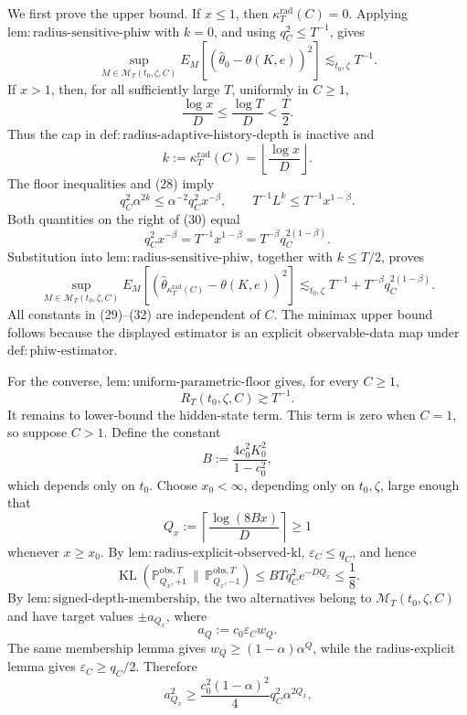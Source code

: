 We first prove the upper bound.  If \(x\le1\), then \(\kappa_T^{\mathrm{rad}}(C)=0\).  Applying \(\mathrm{lem{:}radius\text{-}sensitive\text{-}phiw}\) with \(k=0\), and using \(q_C^2\le T^{-1}\), gives
\[
 \sup_{M\in\mathcal M_T(t_0,\zeta,C)}
 E_M[(\widehat\theta_0-\theta(K,e))^2]
 \lesssim_{t_0,\zeta}T^{-1}. \tag{29}
\]
If \(x>1\), then, for all sufficiently large \(T\), uniformly in \(C\ge1\),
\[
 \frac{\log x}{D}\le\frac{\log T}{D}<\frac T2.
\]
Thus the cap in \(\mathrm{def{:}radius\text{-}adaptive\text{-}history\text{-}depth}\) is inactive and
\[
 k:=\kappa_T^{\mathrm{rad}}(C)=\left\lfloor\frac{\log x}{D}\right\rfloor.
\]
The floor inequalities and (28) imply
\[
 q_C^2\alpha^{2k}
 \le\alpha^{-2}q_C^2x^{-\beta},
 \qquad
 T^{-1}L^k
 \le T^{-1}x^{1-\beta}. \tag{30}
\]
Both quantities on the right of (30) equal
\[
 q_C^2x^{-\beta}
 =T^{-1}x^{1-\beta}
 =T^{-\beta}q_C^{2(1-\beta)}. \tag{31}
\]
Substitution into \(\mathrm{lem{:}radius\text{-}sensitive\text{-}phiw}\), together with \(k\le T/2\), proves
\[
 \sup_{M\in\mathcal M_T(t_0,\zeta,C)}
 E_M[(\widehat\theta_{\kappa_T^{\mathrm{rad}}(C)}-\theta(K,e))^2]
 \lesssim_{t_0,\zeta}
 T^{-1}+T^{-\beta}q_C^{2(1-\beta)}. \tag{32}
\]
All constants in (29)--(32) are independent of \(C\).  The minimax upper bound follows because the displayed estimator is an explicit observable-data map under \(\mathrm{def{:}phiw\text{-}estimator}\).

For the converse, \(\mathrm{lem{:}uniform\text{-}parametric\text{-}floor}\) gives, for every \(C\ge1\),
\[
 R_T(t_0,\zeta,C)\gtrsim T^{-1}. \tag{33}
\]
It remains to lower-bound the hidden-state term.  This term is zero when \(C=1\), so suppose \(C>1\).  Define the constant
\[
 B:=\frac{4c_0^2K_0^2}{1-c_0^2},
\]
which depends only on \(t_0\).  Choose \(x_0<\infty\), depending only on \(t_0,\zeta\), large enough that
\[
 Q_x:=\left\lceil\frac{\log(8Bx)}D\right\rceil\ge1
\]
whenever \(x\ge x_0\).  By \(\mathrm{lem{:}radius\text{-}explicit\text{-}observed\text{-}kl}\), \(\varepsilon_C\le q_C\), and hence
\[
 \operatorname{KL}(\mathbb P_{Q_x,+1}^{\mathrm{obs},T}\,\|\,
                    \mathbb P_{Q_x,-1}^{\mathrm{obs},T})
 \le BTq_C^2e^{-DQ_x}\le\frac18. \tag{34}
\]
By \(\mathrm{lem{:}signed\text{-}depth\text{-}membership}\), the two alternatives belong to \(\mathcal M_T(t_0,\zeta,C)\) and have target values \(\pm a_{Q_x}\), where
\[
 a_Q:=c_0\varepsilon_Cw_Q.
\]
The same membership lemma gives \(w_Q\ge(1-\alpha)\alpha^Q\), while the radius-explicit lemma gives \(\varepsilon_C\ge q_C/2\).  Therefore
\[
 a_{Q_x}^2
 \ge\frac{c_0^2(1-\alpha)^2}{4}q_C^2\alpha^{2Q_x}. \tag{35}
\]

